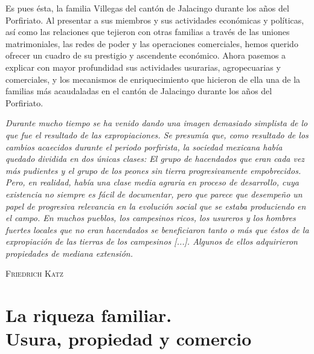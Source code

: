 \documentclass[14pt,twoside,final]{extbook} %
\begin{document}
Es pues ésta, la familia Villegas del cantón de Jalacingo durante los años del Porfiriato. Al presentar a sus miembros y sus actividades económicas y políticas, así como las relaciones que tejieron con otras familias a través de las uniones matrimoniales, las redes de poder y las operaciones comerciales, hemos querido ofrecer un cuadro de su prestigio y ascendente económico. Ahora pasemos a explicar con mayor profundidad sus actividades usurarias, agropecuarias y comerciales, y los mecanismos de enriquecimiento que hicieron de ella una de la familias más acaudaladas en el cantón de Jalacingo durante los años del Porfiriato.
\newpage
\pagestyle{empty}
\begin{flushright}
\begin{minipage}{8cm}
\emph{Durante mucho tiempo se ha venido dando una imagen demasiado simplista de lo que fue el resultado de las expropiaciones. Se presumía que, como resultado de los cambios acaecidos durante el periodo porfirista, la sociedad mexicana había quedado dividida en dos únicas clases: El grupo de hacendados que eran cada vez más pudientes y el grupo de los peones sin tierra progresivamente empobrecidos. Pero, en realidad, había una clase media agraria en proceso de desarrollo, cuya existencia no siempre es fácil de documentar, pero que parece que desempeño un papel de progresiva relevancia en la evolución social que se estaba produciendo en el campo. En muchos pueblos, los campesinos ricos, los usureros y los hombres fuertes locales que no eran hacendados se beneficiaron tanto o más que éstos de la expropiación de las tierras de los campesinos \emph{[...]}. Algunos de ellos adquirieron propiedades de mediana extensión.}
\end{minipage}
\end{flushright}
\begin{flushright}
\textsc{Friedrich Katz}
\end{flushright}
\chapter[La riqueza familiar. Usura, propiedad y comercio]{La riqueza familiar. \\ Usura, propiedad y comercio}
\label{ch:capitulo-tres}
\thispagestyle{empty}
\pagestyle{fancy}
\fancyhf{} %
\fancyhead[RO,LE]{\iffloatpage{}{\thepage}}
\renewcommand\headrulewidth{\iffloatpage{0pt}{0pt}}
\end{document}
